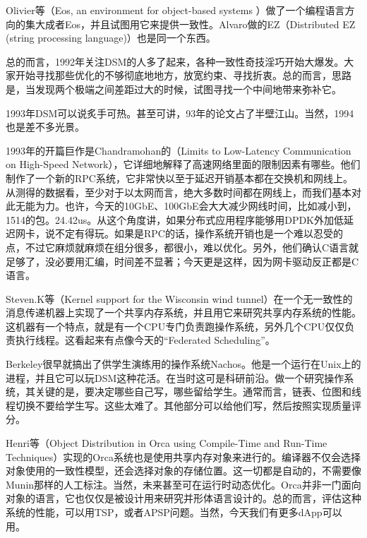 \documentclass[a4paper,twoside]{scrbook}
\begin{document}
Olivier等（Eos, an environment for object-based systems ）做了一个编程语言方向的集大成者Eos，并且试图用它来提供一致性。Alvaro做的EZ（Distributed EZ (string processing language)）也是同一个东西。

总的而言，1992年关注DSM的人多了起来，各种一致性奇技淫巧开始大爆发。大家开始寻找那些优化的不够彻底地地方，放宽约束、寻找折衷。总的而言，思路是，当发现两个极端之间差距过大的时候，试图寻找一个中间地带来弥补它。
















1993年DSM可以说炙手可热。甚至可讲，93年的论文占了半壁江山。当然，1994也是差不多光景。

1993年的开篇巨作是Chandramohan的（Limits to Low-Latency Communication on High-Speed Network），它详细地解释了高速网络里面的限制因素有哪些。他们制作了一个新的RPC系统，它非常快以至于延迟开销基本都在交换机和网线上。从测得的数据看，至少对于以太网而言，绝大多数时间都在网线上，而我们基本对此无能为力。也许，今天的10GbE、100GbE会大大减少网线时间，比如减小到，1514的包。24.42us。从这个角度讲，如果分布式应用程序能够用DPDK外加低延迟网卡，说不定有得玩。如果是RPC的话，操作系统开销也是一个难以忍受的点，不过它麻烦就麻烦在组分很多，都很小，难以优化。另外，他们确认C语言就足够了，没必要用汇编，时间差不显著；今天更是这样，因为网卡驱动反正都是C语言。

Steven.K等（Kernel support for the Wisconsin wind tunnel）在一个无一致性的消息传递机器上实现了一个共享内存系统，并且用它来研究共享内存系统的性能。这机器有一个特点，就是有一个CPU专门负责跑操作系统，另外几个CPU仅仅负责执行线程。这看起来有点像今天的“Federated Scheduling”。

Berkeley很早就搞出了供学生演练用的操作系统Nachos。他是一个运行在Unix上的进程，并且它可以玩DSM这种花活。在当时这可是科研前沿。做一个研究操作系统，其关键的是，要决定哪些自己写，哪些留给学生。通常而言，链表、位图和线程切换不要给学生写。这些太难了。其他部分可以给他们写，然后按照实现质量评分。

Henri等（Object Distribution in Orca using Compile-Time and Run-Time Techniques）实现的Orca系统也是使用共享内存对象来进行的。编译器不仅会选择对象使用的一致性模型，还会选择对象的存储位置。这一切都是自动的，不需要像Munin那样的人工标注。当然，未来甚至可在运行时动态优化。Orca并非一门面向对象的语言，它也仅仅是被设计用来研究并形体语言设计的。总的而言，评估这种系统的性能，可以用TSP，或者APSP问题。当然，今天我们有更多dApp可以用。
\end{document}
